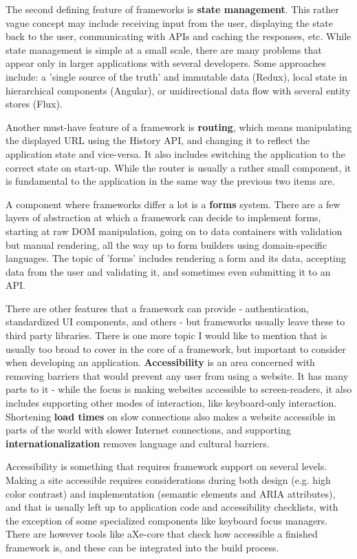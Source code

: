 \documentclass[english,odsaz]{fitthesis}
\begin{document}
The second defining feature of frameworks is \textbf{state management}. This rather vague
concept may include receiving input from the user, displaying the state back to
the user, communicating with APIs and caching the responses, etc. While state
management is simple at a small scale, there are many problems that appear only
in larger applications with several developers. Some approaches include: a
'single source of the truth' and immutable data (Redux), local state in
hierarchical components (Angular), or unidirectional data flow with several
entity stores (Flux).

Another must-have feature of a framework is \textbf{routing}, which means manipulating
the displayed URL using the History API, and changing it to reflect the
application state and vice-versa. It also includes switching the application to
the correct state on start-up. While the router is usually a rather small
component, it is fundamental to the application in the same way the previous two
items are.

A component where frameworks differ a lot is a \textbf{forms} system. There are a few
layers of abstraction at which a framework can decide to implement forms,
starting at raw DOM manipulation, going on to data containers with validation
but manual rendering, all the way up to form builders using domain-specific
languages. The topic of 'forms' includes rendering a form and its data,
accepting data from the user and validating it, and sometimes even submitting it
to an API.

There are other features that a framework can provide - authentication,
standardized UI components, and others - but frameworks usually leave these to
third party libraries. There is one more topic I would like to mention that is
usually too broad to cover in the core of a framework, but important to consider
when developing an application. \textbf{Accessibility} is an area concerned with removing
barriers that would prevent any user from using a website. It has many parts to
it - while the focus is making websites accessible to screen-readers, it also
includes supporting other modes of interaction, like keyboard-only
interaction. Shortening \textbf{load times} on slow connections also makes a website
accessible in parts of the world with slower Internet connections, and
supporting \textbf{internationalization} removes language and cultural barriers.

Accessibility is something that requires framework support on several
levels. Making a site accessible requires considerations during both design
(e.g. high color contrast) and implementation (semantic elements and ARIA
attributes), and that is usually left up to application code and accessibility
checklists, with the exception of some specialized components like keyboard
focus managers. There are however tools like aXe-core that check how accessible
a finished framework is, and these can be integrated into the build process.
\end{document}

